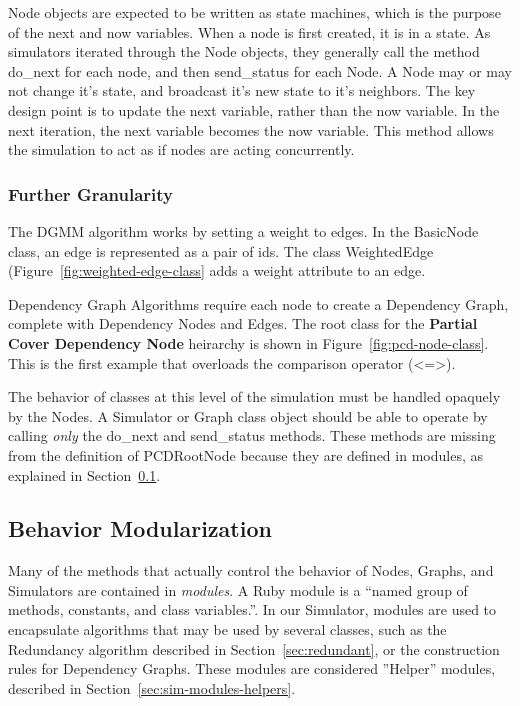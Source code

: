 

Node objects are expected to be written as state machines, which is the purpose of the next and now variables. When a node is first created, it is in a state. As simulators iterated through the Node objects, they generally call the method {\ttfamily do\_next} for each node, and then {\ttfamily send\_status} for each Node. A Node may or may not change it's state, and broadcast it's new state to it's neighbors. The key design point is to update the {\ttfamily next} variable, rather than the {\ttfamily now} variable. In the next iteration, the {\ttfamily next} variable becomes the {\ttfamily now} variable. This method allows the simulation to act as if nodes are acting concurrently.

\subsubsection{Further Granularity}

The DGMM algorithm works by setting a weight to edges. In the {\ttfamily BasicNode} class, an edge is represented as a pair of ids. The class {\ttfamily WeightedEdge} (Figure~\ref{fig:weighted-edge-class} adds a {\ttfamily weight} attribute to an edge. 

Dependency Graph Algorithms require each node to create a Dependency Graph, complete with Dependency Nodes and Edges. The root class for the {\bfseries Partial Cover Dependency Node} heirarchy is shown in Figure~\ref{fig:pcd-node-class}. This is the first example that overloads the comparison operator ({\ttfamily <=>}). 

The behavior of classes at this level of the simulation must be handled opaquely by the Nodes. A Simulator or Graph class object should be able to operate by calling {\em only} the {\ttfamily do\_next} and {\ttfamily send\_status} methods. These methods are missing from the definition of PCDRootNode because they are defined in modules, as explained in Section~\ref{sec:sim-modules}.




\subsection{Behavior Modularization}
\label{sec:sim-modules}

Many of the methods that actually control the behavior of Nodes, Graphs, and Simulators are contained in {\em modules}. A Ruby module is a ``named group of methods, constants, and class variables.''\cite{1408408}. In our Simulator, modules are used to encapsulate algorithms that may be used by several classes, such as the Redundancy algorithm described in Section~\ref{sec:redundant}, or the construction rules for Dependency Graphs. These modules are considered ''Helper'' modules, described in Section~\ref{sec:sim-modules-helpers}.

